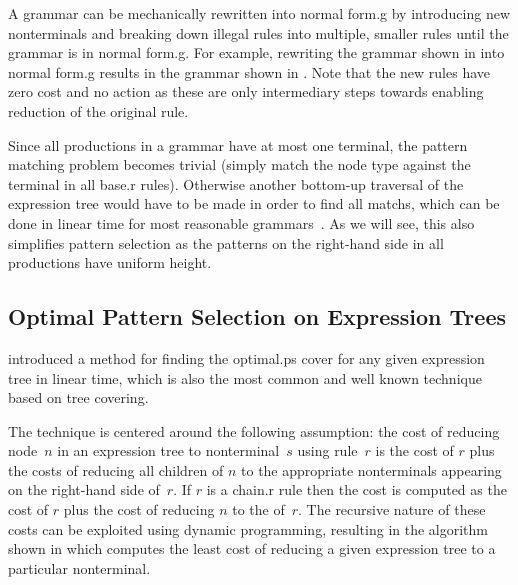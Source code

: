 A \gls{grammar} can be mechanically rewritten into \gls{normal form.g} by
introducing new \glspl{nonterminal} and breaking down illegal \glspl{rule} into
multiple, smaller \glspl{rule} until the \gls{grammar} is in \gls{normal
  form.g}.
%
For example, rewriting the \gls{grammar} shown in
 into \gls{normal form.g} results in the
\gls{grammar} shown in .
%
Note that the new \glspl{rule} have zero cost and no action as these are only
intermediary steps towards enabling reduction of the original \gls{rule}.

Since all \glspl{production} in a  \gls{grammar} have at
most one \gls{terminal}, the \gls{pattern matching} problem becomes trivial
(simply match the \gls{node} type against the \gls{terminal} in all \gls{base.r}
\glspl{rule}).
%
Otherwise another bottom-up traversal of the \gls{expression tree} would have to
be made in order to find all \glspl{match}, which can be done in linear time for
most reasonable \glspl{grammar}~\cite{HoffmannODonnell:1982}.
%
As we will see, this also simplifies \gls{pattern selection} as the
\glspl{pattern} on the right-hand side in all \glspl{production} have uniform
height.


\subsection{Optimal Pattern Selection on Expression Trees}

\textcite{AhoEtAl:1989} introduced a method for finding the \gls{optimal.ps}
\gls{cover} for any given \gls{expression tree} in linear time, which is also
the most common and well known technique based on \gls{tree covering}.

The technique is centered around the following assumption: the cost of reducing
\gls{node}~$n$ in an \gls{expression tree} to \gls{nonterminal}~$s$ using
\gls{rule}~$r$ is the cost of $r$ plus the costs of reducing all children of $n$
to the appropriate \glspl{nonterminal} appearing on the right-hand side of~$r$.
%
If $r$ is a \gls{chain.r} \gls{rule} then the cost is computed as the cost of
$r$ plus the cost of reducing $n$ to the  of~$r$.
%
The recursive nature of these costs can be exploited using dynamic programming,
resulting in the algorithm shown in  which
computes the least cost of reducing a given \gls{expression tree} to a
particular \gls{nonterminal}.


